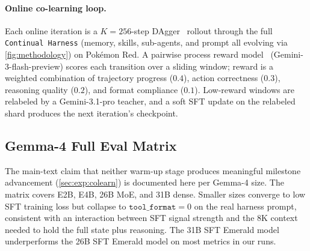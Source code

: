 \documentclass[11pt]{article}
\begin{document}
\paragraph{Online co-learning loop.} Each online iteration is a $K{=}256$-step DAgger~\citep{ross2011reduction,karten2026smallexperts} rollout through the full \texttt{Continual Harness} (memory, skills, sub-agents, and prompt all evolving via \cref{fig:methodology}) on Pok\'emon Red. A pairwise process reward model~\citep{wang2026openclawrl} (Gemini-3-flash-preview) scores each transition over a sliding window; reward is a weighted combination of trajectory progress ($0.4$), action correctness ($0.3$), reasoning quality ($0.2$), and format compliance ($0.1$). Low-reward windows are relabeled by a Gemini-3.1-pro teacher, and a soft SFT update on the relabeled shard produces the next iteration's checkpoint.

\subsection{Gemma-4 Full Eval Matrix}\label{app:h6_full}

The main-text claim that neither warm-up stage produces meaningful milestone advancement (\cref{sec:exp:colearn}) is documented here per Gemma-4 size. The matrix covers E2B, E4B, 26B MoE, and 31B dense. Smaller sizes converge to low SFT training loss but collapse to $\texttt{tool\_format}{=}0$ on the real harness prompt, consistent with an interaction between SFT signal strength and the 8K context needed to hold the full state plus reasoning. The 31B SFT Emerald model underperforms the 26B SFT Emerald model on most metrics in our runs.
\end{document}
